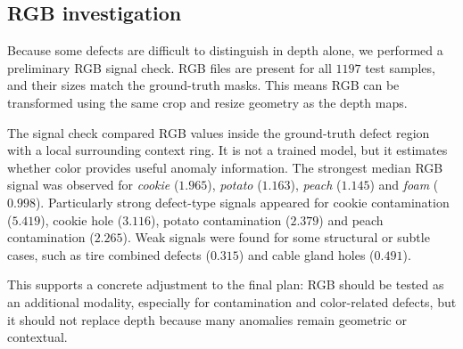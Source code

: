\subsection*{RGB investigation}
Because some defects are difficult to distinguish in depth alone, we performed a preliminary RGB signal check. RGB files are present for all $1197$ test samples, and their sizes match the ground-truth masks. This means RGB can be transformed using the same crop and resize geometry as the depth maps.

The signal check compared RGB values inside the ground-truth defect region with a local surrounding context ring. It is not a trained model, but it estimates whether color provides useful anomaly information. The strongest median RGB signal was observed for \textit{cookie} ($1.965$), \textit{potato} ($1.163$), \textit{peach} ($1.145$) and \textit{foam} ($0.998$). Particularly strong defect-type signals appeared for cookie contamination ($5.419$), cookie hole ($3.116$), potato contamination ($2.379$) and peach contamination ($2.265$). Weak signals were found for some structural or subtle cases, such as tire combined defects ($0.315$) and cable gland holes ($0.491$).

This supports a concrete adjustment to the final plan: RGB should be tested as an additional modality, especially for contamination and color-related defects, but it should not replace depth because many anomalies remain geometric or contextual.
